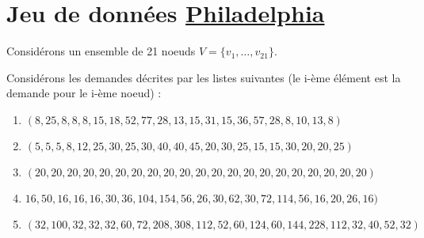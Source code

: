 \documentclass[a4paper,francais]{article}
\theoremstyle{definition}
\begin{document}
\section{Jeu de données
\href{http://fap.zib.de/problems/Philadelphia/}{Philadelphia}}

Considérons un ensemble de 21 noeuds $V = \{v_1, \dots, v_{21} \}$.

Considérons les demandes décrites par les listes suivantes
(le i-ème élément est la demande pour le i-ème noeud) :
\begin{enumerate}[label=(L\arabic*)]
\item $(8,25,8,8,8,15,18,52,77,28,13,15,31,15,36,57,28,8,10,13,8)$
\item $(5,5,5,8,12,25,30,25,30,40,40,45,20,30,25,15,15,30,20,20,25)$
\item $(20,20,20,20,20,20,20,20,20,20,20,20,20,20,20,20,20,20,20,20,20)$
\item $16,50,16,16,16,30,36,104,154,56,26,30,62,30,72,114,56,16,20,26,16)$
\item $(32,100,32,32,32,60,72,208,308,112,52,60,124,60,144,228,112,32,40,52,32)$
\end{enumerate}
\end{document}
